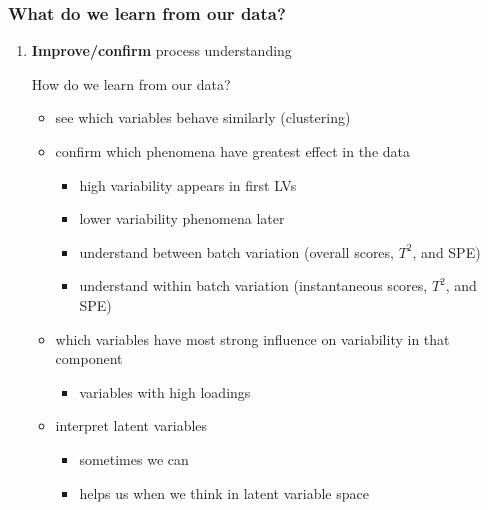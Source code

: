 \begin{frame}\frametitle{What do we learn from our data?}

\begin{enumerate}
	\item {\bf \color{myGreen}Improve/confirm} process understanding
	
		 How do we learn from our data?
\begin{itemize}

	\item	see which variables behave similarly (clustering) \pause
	\item	confirm which phenomena have greatest effect in the data 
	\begin{itemize}
		\item	high variability appears in first LVs
		\item	lower variability phenomena later
	\end{itemize}\pause
	
	\begin{itemize}
		\item 	understand between batch variation (overall scores, \( T^2 \), and SPE)
		\item 	understand within batch variation (instantaneous scores, \( T^2 \), and SPE)
	\end{itemize}

	\item	which variables have most strong influence on variability in that component
	\begin{itemize}
		\item variables with high loadings
	\end{itemize}\pause

	\item	interpret latent variables
	\begin{itemize}
		\item	sometimes we can
		\item	helps us when we think in latent variable space
	\end{itemize}
\end{itemize}
\end{enumerate}
\end{frame}

